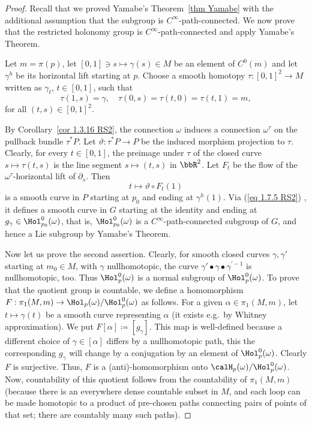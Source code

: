 \begin{proof}
    Recall that we proved Yamabe's Theorem~\ref{thm Yamabe} with the additional assumption that the subgroup is $C^\infty$-path-connected. We now prove that the restricted holonomy group is $C^\infty$-path-connected and apply Yamabe's Theorem.

    Let $m=\pi(p)$, let $[0,1]\ni s\mapsto \gamma(s)\in M$ be an element of $C^0(m)$ and let $\gamma^h$ be its horizontal lift starting at $p$. Choose a smooth homotopy $\tau:[0,1]^2\to M$ written as $\gamma_t$, $t\in[0,1]$, such that
    \[\tau(1,s)=\gamma,\quad \tau(0,s)=\tau(t,0)=\tau(t,1)=m,\]
    for all $(t,s)\in [0,1]^2$.

    By Corollary~\ref{cor 1.3.16 RS2}, the connection $\omega$ induces a connection $\omega^\tau$ on the pullback bundle $\tau^\ast P$. Let $\vartheta:\tau^\ast P\to P$ be the induced morphism projection to $\tau$. Clearly, for every $t\in [0,1]$, the preimage under $\tau$ of the closed curve $s\mapsto \tau(t,s)$ is the line segment $s\mapsto (t,s)$ in $\bbR^2$. Let $F_t$ be the flow of the $\omega^\tau$-horizontal lift of $\partial_s$. Then
    \[t\mapsto \vartheta\circ F_t(1)\]
    is a smooth curve in $P$ starting at $p_0$ and ending at $\gamma^h(1)$. Via (\ref{eq 1.7.5 RS2}) , it defines a smooth curve in $G$ starting at the identity and ending at $g_\gamma\in \Hol^0_{p_0}(\omega)$, that is, $\Hol^0_{p_0}(\omega)$ is a $C^\infty$-path-connected subgroup of $G$, and hence a Lie subgroup by Yamabe's Theorem. 

    Now let us prove the second assertion. Clearly, for smooth closed curves $\gamma,\gamma'$ starting at $m_0\in M$, with $\gamma$ nullhomotopic, the curve $\gamma'\bullet\gamma\bullet\gamma^{\prime-1}$ is nullhomotopic, too. Thus $\Hol_p^0(\omega)$ is a normal subgroup of $\Hol_p^0(\omega)$. To prove that the quotient group is countable, we define a homomorphism $F:\pi_1(M,m)\to \Hol_p(\omega)\slash\Hol_p^0(\omega)$ as follows. For a given $\alpha\in\pi_1(M,m)$, let $t\mapsto \gamma(t)$ be a smooth curve representing $\alpha$ (it exists e.g.\ by Whitney approximation). We put $F[\alpha]\coloneqq [g_{\gamma}]$. This map is well-defined because a different choice of $\gamma\in [\alpha]$ differs by a nullhomotopic path, this the corresponding $g_\gamma$ will change by a conjugation by an element of $\Hol^0_p(\omega)$. Clearly $F$ is surjective. Thus, $F$ is a (anti)-homomorphism onto $\calH_p(\omega)\slash \Hol^0_p(\omega)$. Now, countability of this quotient follows from the countability of $\pi_1(M,m)$ (because there is an everywhere dense countable subset in $M$, and each loop can be made homotopic to a product of pre-chosen paths connecting pairs of points of that set; there are countably many such paths).
\end{proof}


